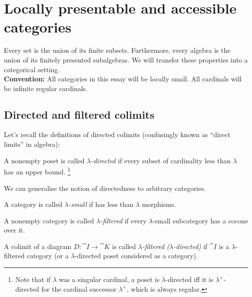 \section{Locally presentable and accessible categories}
\label{sec:presentableaccessible}


Every set is the union of its finite subsets. Furthermore, every algebra is the union of its finitely presented subalgebras. We will transfer these properties into a categorical setting. \\

\textbf{Convention: } All categories in this essay will be locally small. All cardinals will be infinite regular cardinals.

\subsection{Directed and filtered colimits}

Let's recall the definitions of directed colimits (confusingly known as ``direct limits'' in algebra):
\begin{Definition}
A nonempty poset is called \emph{$\lambda$-directed} if every subset of cardinality less than $\lambda$ has an upper bound. \footnote{Note that if $\lambda$ was a singular cardinal, a poset is $\lambda$-directed iff it is $\lambda^+$-directed for the cardinal successor $\lambda^+$, which is always regular.}
\end{Definition}

We can generalise the notion of directedness to arbitrary categories.

\begin{Definition}
A category is called \emph{$\lambda$-small} if has less than $\lambda$ morphisms.
\end{Definition}

\begin{Definition}
A nonempty category is called \emph{$\lambda$-filtered} if every $\lambda$-small subcategory has a cocone over it. 
\end{Definition}

\begin{Definition}
A colimit of a diagram $D : \cat I \to \cat K$ is called \emph{$\lambda$-filtered ($\lambda$-directed)} if $\cat I$ is a $\lambda$-filtered category (or a $\lambda$-directed poset considered as a category). 
\end{Definition}

